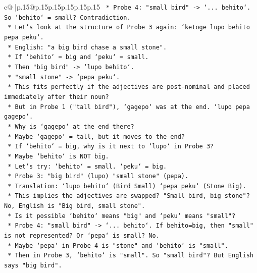 \documentclass{article}
\begin{document}
{\begin{supertabular}{c@{$\;$}|p{.15\linewidth}@{}p{.15\linewidth}p{.15\linewidth}p{.15\linewidth}p{.15\linewidth}p{.15\linewidth}}
{{{\texttt{                    *   Probe 4: "small bird" {-}> `... behito`. So `behito` = small? Contradiction.} \\
\texttt{                *   Let's look at the structure of Probe 3 again: `ketoge lupo behito pepa peku`.} \\
\texttt{                *   English: "a big bird chase a small stone".} \\
\texttt{                *   If `behito` = big and `peku` = small.} \\
\texttt{                    *   Then "big bird" {-}> `lupo behito`.} \\
\texttt{                    *   "small stone" {-}> `pepa peku`.} \\
\texttt{                    *   This fits perfectly if the adjectives are post{-}nominal and placed immediately after their noun?} \\
\texttt{                    *   But in Probe 1 ("tall bird"), `gagepo` was at the end. `lupo pepa gagepo`.} \\
\texttt{                    *   Why is `gagepo` at the end there?} \\
\texttt{                    *   Maybe `gagepo` = tall, but it moves to the end?} \\
\texttt{                    *   If `behito` = big, why is it next to `lupo` in Probe 3?} \\
\texttt{                    *   Maybe `behito` is NOT big.} \\
\texttt{                    *   Let's try: `behito` = small. `peku` = big.} \\
\texttt{                    *   Probe 3: "big bird" (lupo) "small stone" (pepa).} \\
\texttt{                    *   Translation: `lupo behito` (Bird Small) `pepa peku` (Stone Big).} \\
\texttt{                    *   This implies the adjectives are swapped? "Small bird, big stone"? No, English is "Big bird, small stone".} \\
\texttt{                    *   Is it possible `behito` means "big" and `peku` means "small"?} \\
\texttt{                        *   Probe 4: "small bird" {-}> `... behito`. If behito=big, then "small" is not represented? Or `pepa` is small? No.} \\
\texttt{                        *   Maybe `pepa` in Probe 4 is "stone" and `behito` is "small".} \\
\texttt{                        *   Then in Probe 3, `behito` is "small". So "small bird"? But English says "big bird".} \\
}}}
\end{supertabular}}
\end{document}
